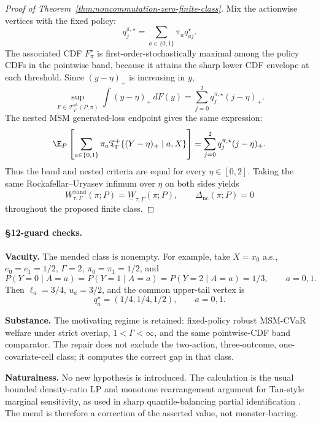 \begin{proof}[Proof of Theorem~\ref{thm:noncommutation-zero-finite-class}]
Mix the actionwise vertices with the fixed policy:
\[
q^{\pi,\star}_j=\sum_{a\in\{0,1\}}\pi_a q^\star_{aj}.
\]
The associated CDF \(F_\pi^\star\) is first-order-stochastically maximal among the policy CDFs in
the pointwise band, because it attains the sharp lower CDF envelope at each threshold.  Since
\((y-\eta)_+\) is increasing in \(y\),
\[
\sup_{F\in\mathcal F_\Gamma^{\mathrm{pt}}(P,\pi)}
\int (y-\eta)_+\,dF(y)
=
\sum_{j=0}^2 q^{\pi,\star}_j(j-\eta)_+.
\]
The nested MSM generated-loss endpoint gives the same expression:
\[
\E_P\left[
\sum_{a\in\{0,1\}}\pi_a
\mathfrak T_\Gamma^+\{(Y-\eta)_+\mid a,X\}
\right]
=
\sum_{j=0}^2 q^{\pi,\star}_j(j-\eta)_+.
\]
Thus the band and nested criteria are equal for every \(\eta\in[0,2]\).  Taking the same
Rockafellar--Uryasev infimum over \(\eta\) on both sides yields
\[
W_{\tau,\Gamma}^{\mathrm{band}}(\pi;P)
=
\underline W_{\tau,\Gamma}(\pi;P),
\qquad
\Delta_{\mathrm{nc}}(\pi;P)=0
\]
throughout the proposed finite class.
\end{proof}

\paragraph{\S12-guard checks.}
\textbf{Vacuity.}  The mended class is nonempty.  For example, take \(X=x_0\) a.s.,
\(e_0=e_1=1/2\), \(\Gamma=2\), \(\pi_0=\pi_1=1/2\), and
\[
P(Y=0\mid A=a)=P(Y=1\mid A=a)=P(Y=2\mid A=a)=1/3,\qquad a=0,1.
\]
Then \(\ell_a=3/4\), \(u_a=3/2\), and the common upper-tail vertex is
\[
q_a^\star=(1/4,1/4,1/2),\qquad a=0,1.
\]

\textbf{Substance.}  The motivating regime is retained: fixed-policy robust MSM-CVaR welfare under
strict overlap, \(1<\Gamma<\infty\), and the same pointwise-CDF band comparator.  The repair does not
exclude the two-action, three-outcome, one-covariate-cell class; it computes the correct gap in that
class.

\textbf{Naturalness.}  No new hypothesis is introduced.  The calculation is the usual bounded
density-ratio LP and monotone rearrangement argument for Tan-style marginal sensitivity, as used in
sharp quantile-balancing partial identification \cite{DornGuo2021QuantileBalancing}.  The mend is
therefore a correction of the asserted value, not monster-barring.


